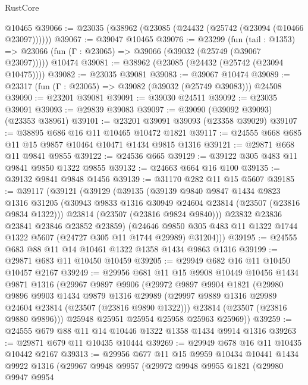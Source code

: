 \begin{lexlean}{RustCore}
\begin{coremodule}
    @10465
@39066 := @23035 (@38962 (@23085 (@24432 (@25742 (@23094 (@10466 @23097))))))
@39067 := @39047 @10465
@39076 := @23299
    (fun (tail : @1353) => @23066 (fun (Γ : @23065) => @39066 (@39032 (@25749 (@39067 @23097)))))
    @10474
@39081 := @38962 (@23085 (@24432 (@25742 (@23094 @10475))))
@39082 := @23035 @39081
@39083 := @39067 @10474
@39089 := @23317 (fun (Γ : @23065) => @39082 (@39032 (@25749 @39083))) @24508
@39090 := @23201 @39081
@39091 := @39030 @24511
@39092 := @23035 @39091
@39093 := @29839 @39083
@39097 := @39090 (@39092 @39093) (@23353 @38961)
@39101 := @23201 @39091 @39093 (@23358 @39029)
@39107 := @38895 @686 @16 @11 @10465 @10472 @1821
@39117 := @24555 @668 @685 @11 @15 @9857 @10464 @10471 @1434 @9815 @1316
@39121 := @29871 @668 @11 @9841 @9855
@39122 := @24536 @665
@39129 := @39122 @305 @483 @11 @9841 @9850 @1322 @9855
@39132 := @24663 @664 @16 @100
@39135 := @39132 @9841 @9848 @1456
@39139 := @31170 @282 @11 @15 @5607
@39185 := @39117
    (@39121
      (@39129
        (@39135
          (@39139
            @9840
            @9847
            @1434
            @9823
            @1316
            @31205
            (@30943 @9833 @1316 @30949 @24604 @23814 (@23507 (@23816 @9834 @1322)))
            @23814
            (@23507 (@23816 @9824 @9840)))
          @23832
          @23836
          @23841
          @23846
          @23852
          @23859)
        (@24646 @9850 @305 @483 @11 @1322 @1744 @1322 @5607 (@24727 @305 @11 @1744 @29989) @31204)))
@39195 := @24555 @683 @88 @11 @14 @10461 @1322 @1358 @1434 @9863 @1316
@39199 := @29871 @683 @11 @10450 @10459
@39205 := @29949 @682 @16 @11 @10450 @10457 @2167
@39249 := @29956
    @681
    @11
    @15
    @9908
    @10449
    @10456
    @1434
    @9871
    @1316
    (@29967
      @9897
      @9906
      (@29972
        @9897
        @9904
        @1821
        (@29980
          @9896
          @9903
          @1434
          @9879
          @1316
          @29989
          (@29997 @9889 @1316 @29989 @24604 @23814 (@23507 (@23816 @9890 @1322)))
          @23814
          (@23507 (@23816 @9880 @9896)))
        @25948
        @25951
        @25954
        @25958
        @25963
        @25969))
@39259 := @24555 @679 @88 @11 @14 @10446 @1322 @1358 @1434 @9914 @1316
@39263 := @29871 @679 @11 @10435 @10444
@39269 := @29949 @678 @16 @11 @10435 @10442 @2167
@39313 := @29956
    @677
    @11
    @15
    @9959
    @10434
    @10441
    @1434
    @9922
    @1316
    (@29967
      @9948
      @9957
      (@29972
        @9948
        @9955
        @1821
        (@29980
          @9947
          @9954

\end{coremodule}
\end{lexlean}
